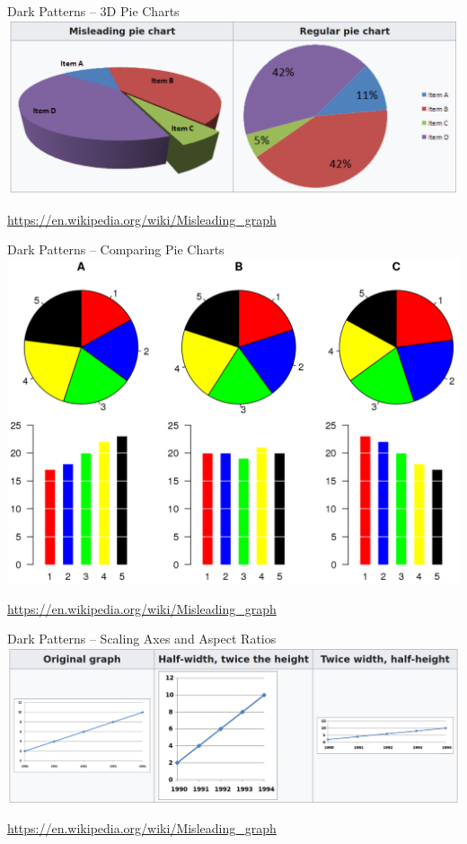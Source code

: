 \documentclass[ignorenonframetext,xcolor=x11names]{beamer}
\begin{document}
\begin{frame}{Dark Patterns -- 3D Pie Charts}
\centering
\includegraphics[width=\textwidth]{screen6.png}

\scriptsize\url{https://en.wikipedia.org/wiki/Misleading_graph}
\end{frame}

\begin{frame}{Dark Patterns -- Comparing Pie Charts}
\centering
\includegraphics[width=\textwidth]{screen7.png}

\scriptsize\url{https://en.wikipedia.org/wiki/Misleading_graph}
\end{frame}

\begin{frame}{Dark Patterns -- Scaling Axes and Aspect Ratios}
\centering
\includegraphics[width=\textwidth]{screen4.png}

\scriptsize\url{https://en.wikipedia.org/wiki/Misleading_graph}
\end{frame}
\end{document}
